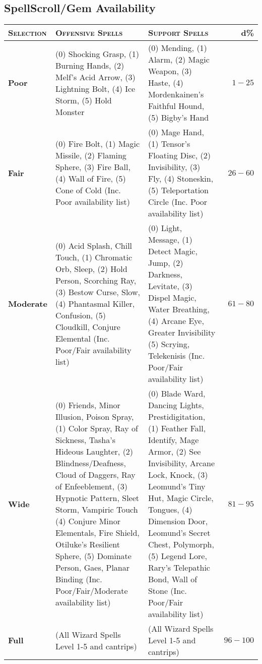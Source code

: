 \documentclass[a5paper,8pt]{book}
\begin{document}
\subsection{SpellScroll/Gem Availability}
\begin{tabularx}{\textwidth}{lXXr}
    \hline
    \textbf{\textsc{Selection}} & \textbf{\textsc{Offensive Spells}} & \textbf{\textsc{Support Spells}} & \textbf{d\%}\\\hline
    \textbf{Poor} & (0) Shocking Grasp, (1) Burning Hands, (2) Melf's Acid Arrow, (3) Lightning Bolt, (4) Ice Storm, (5) Hold Monster & (0) Mending, (1) Alarm, (2) Magic Weapon, (3) Haste, (4) Mordenkainen's Faithful Hound, (5) Bigby's Hand & $1-25$\\
    \textbf{Fair} & (0) Fire Bolt, (1) Magic Missile, (2) Flaming Sphere, (3) Fire Ball, (4) Wall of Fire, (5) Cone of Cold (Inc. Poor availability list) & (0) Mage Hand, (1) Tensor's Floating Disc, (2) Invisibility, (3) Fly, (4) Stoneskin, (5) Teleportation Circle (Inc. Poor availability list) & $26-60$\\
    \textbf{Moderate} & (0) Acid Splash, Chill Touch, (1) Chromatic Orb, Sleep, (2) Hold Person, Scorching Ray, (3) Bestow Curse, Slow, (4) Phantasmal Killer, Confusion, (5) Cloudkill, Conjure Elemental (Inc. Poor/Fair availability list) & (0) Light, Message, (1) Detect Magic, Jump, (2) Darkness, Levitate, (3) Dispel Magic, Water Breathing, (4) Arcane Eye, Greater Invisibility (5) Scrying, Telekenisis (Inc. Poor/Fair availability list) & $61-80$\\
    \textbf{Wide} & (0) Friends, Minor Illusion, Poison Spray, (1) Color Spray, Ray of Sickness, Tasha's Hideous Laughter, (2) Blindness/Deafness, Cloud of Daggers, Ray of Enfeeblement, (3) Hypnotic Pattern, Sleet Storm, Vampiric Touch (4) Conjure Minor Elementals, Fire Shield, Otiluke's Resilient Sphere, (5) Dominate Person, Gaes, Planar Binding (Inc. Poor/Fair/Moderate availability list) & (0) Blade Ward, Dancing Lights, Prestidigitation, (1) Feather Fall, Identify, Mage Armor, (2) See Invisibility, Arcane Lock, Knock, (3) Leomund's Tiny Hut, Magic Circle, Tongues, (4) Dimension Door, Leomund's Secret Chest, Polymorph, (5) Legend Lore, Rary's Telepathic Bond, Wall of Stone (Inc. Poor/Fair availability list) & $81-95$\\
    \textbf{Full} & (All Wizard Spells Level 1-5 and cantrips) & (All Wizard Spells Level 1-5 and cantrips) & $96-100$\\\hline
\end{tabularx}
\end{document}
